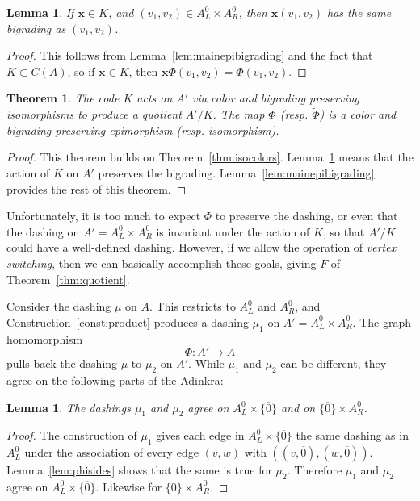 \documentclass[12pt,twoside,singlespace]{article}
\numberwithin{equation}{section}
\newtheorem{thm}[equation]{Theorem}
\newtheorem{lem}[equation]{Lemma}
\theoremstyle{definition}
\renewcommand{\vec}[1]{\mathbf{#1}}
\begin{document}
\begin{lem}
\label{lem:kgrading}
If $\vec{x}\in K$, and $(v_1,v_2)\in A_L^0\times A_R^0$, then $\vec{x}(v_1,v_2)$ has the same bigrading as $(v_1,v_2)$.
\end{lem}
\begin{proof}
This follows from Lemma~\ref{lem:mainepibigrading} and the fact that $K\subset C(A)$, so if $\vec{x}\in K$, then $\vec{x}\Phi(v_1,v_2)=\Phi(v_1,v_2)$.
\end{proof}

\begin{thm}
\label{thm:isograding}
The code $K$ acts on $A'$ via color and bigrading preserving isomorphisms to produce a quotient $A'/K$.  The map $\Phi$ (resp. $\tilde{\Phi}$) is a color and bigrading preserving epimorphism (resp. isomorphism).
\end{thm}
\begin{proof}
This theorem builds on Theorem~\ref{thm:isocolors}.  Lemma~\ref{lem:kgrading} means that the action of $K$ on $A'$ preserves the bigrading.  Lemma~\ref{lem:mainepibigrading} provides the rest of this theorem.
\end{proof}


Unfortunately, it is too much to expect $\Phi$ to preserve the dashing, or even that the dashing on $A'=A_L^0\times A_R^0$ is invariant under the action of $K$, so that $A'/K$ could have a well-defined dashing.  However, if we allow the operation of \emph{vertex switching}, then we can basically accomplish these goals, giving $F$ of Theorem~\ref{thm:quotient}.

Consider the dashing $\mu$ on $A$.  This restricts to $A_L^0$ and $A_R^0$, and Construction~\ref{const:product} produces a dashing $\mu_1$ on $A'=A_L^0\times A_R^0$.   The graph homomorphism
\[\Phi:A'\to A\]
pulls back the dashing $\mu$ to $\mu_2$ on $A'$. While $\mu_1$ and $\mu_2$ can be different, they agree on the following parts of the Adinkra:

\begin{lem}
\label{lem:agree-on-boundary}
The dashings $\mu_1$ and $\mu_2$ agree on $A_L^0\times \{\overline{0}\}$ and on $\{\overline{0}\}\times A_R^0$.
\end{lem}
\begin{proof}
The construction of $\mu_1$ gives each edge in $A_L^0\times\{\overline{0}\}$ the same dashing as in $A_L^0$ under the association of every edge $(v,w)$ with $((v,\overline{0}),(w,\overline{0}))$.  Lemma~\ref{lem:phisides} shows that the same is true for $\mu_2$.  Therefore $\mu_1$ and $\mu_2$ agree on $A_L^0\times\{\overline{0}\}$.  Likewise for $\{0\}\times A_R^0$.
\end{proof}
\end{document}
